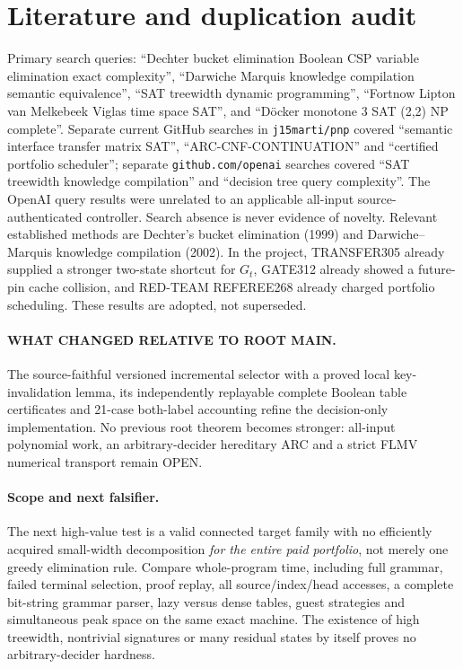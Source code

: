 \documentclass[11pt]{article}
\begin{document}
\section{Literature and duplication audit}
Primary search queries: ``Dechter bucket elimination Boolean CSP variable elimination exact complexity'', ``Darwiche Marquis knowledge compilation semantic equivalence'', ``SAT treewidth dynamic programming'', ``Fortnow Lipton van Melkebeek Viglas time space SAT'', and ``D\"ocker monotone 3 SAT (2,2) NP complete''. Separate current GitHub searches in \texttt{j15marti/pnp} covered ``semantic interface transfer matrix SAT'', ``ARC-CNF-CONTINUATION'' and ``certified portfolio scheduler''; separate \texttt{github.com/openai} searches covered ``SAT treewidth knowledge compilation'' and ``decision tree query complexity''. The OpenAI query results were unrelated to an applicable all-input source-authenticated controller. Search absence is never evidence of novelty. Relevant established methods are Dechter's bucket elimination (1999) and Darwiche--Marquis knowledge compilation (2002). In the project, TRANSFER305 already supplied a stronger two-state shortcut for $G_t$, GATE312 already showed a future-pin cache collision, and RED-TEAM REFEREE268 already charged portfolio scheduling. These results are adopted, not superseded.

\paragraph{WHAT CHANGED RELATIVE TO ROOT MAIN.} The source-faithful versioned incremental selector with a proved local key-invalidation lemma, its independently replayable complete Boolean table certificates and 21-case both-label accounting refine the decision-only implementation. No previous root theorem becomes stronger: all-input polynomial work, an arbitrary-decider hereditary ARC and a strict FLMV numerical transport remain OPEN.

\paragraph{Scope and next falsifier.} The next high-value test is a valid connected target family with no efficiently acquired small-width decomposition \emph{for the entire paid portfolio}, not merely one greedy elimination rule. Compare whole-program time, including full grammar, failed terminal selection, proof replay, all source/index/head accesses, a complete bit-string grammar parser, lazy versus dense tables, guest strategies and simultaneous peak space on the same exact machine. The existence of high treewidth, nontrivial signatures or many residual states by itself proves no arbitrary-decider hardness.
\end{document}
